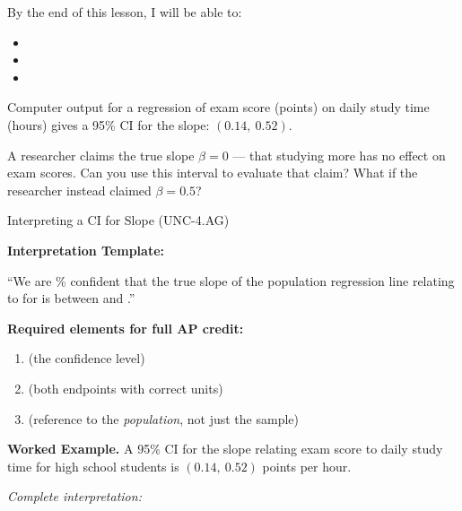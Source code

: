 \documentclass[10pt]{article}
\begin{document}
\namedateperiod

\begin{objectivebox}
By the end of this lesson, I will be able to:
\begin{itemize}
    \item[$\square$] \writeline
    \item[$\square$] \writeline
    \item[$\square$] \writeline
\end{itemize}
\end{objectivebox}

\begin{vocabbox}
\end{vocabbox}

\begin{hookbox}
Computer output for a regression of exam score (points) on daily study time (hours) gives
a 95\% CI for the slope: $(0.14,\ 0.52)$.

A researcher claims the true slope $\beta = 0$ --- that studying more has no effect on exam
scores. Can you use this interval to evaluate that claim?
What if the researcher instead claimed $\beta = 0.5$?

\end{hookbox}

\begin{notesbox}{Interpreting a CI for Slope (UNC-4.AG)}

\textbf{Interpretation Template:}

``We are \blank{2cm}\% confident that the true slope of the population regression line
relating \blank{4cm} to \blank{4cm} for \blank{4cm} is between \blank{2cm} and
\blank{2cm} \blank{3cm}.''

\vspace{0.1in}
\textbf{Required elements for full AP credit:}
\begin{enumerate}
    \item \blank{6cm} (the confidence level)
    \item \blank{8cm} (both endpoints with correct units)
    \item \blank{8cm} (reference to the \emph{population}, not just the sample)
\end{enumerate}

\vspace{0.1in}
\textbf{Worked Example.} A 95\% CI for the slope relating exam score to daily study time
for high school students is $(0.14,\ 0.52)$ points per hour.

\textit{Complete interpretation:} 

\end{notesbox}
\end{document}
